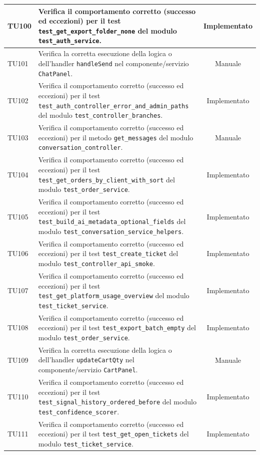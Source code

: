 \documentclass[a4paper,11pt,oneside]{scrartcl}
\begin{document}
\begin{longtable}{|p{1.9cm}|p{11.6cm}|c|}
    TU100 & Verifica il comportamento corretto (successo ed eccezioni) per il test \texttt{test\_get\_export\_folder\_none} del modulo \texttt{test\_auth\_service}. & Implementato \\ \hline
    TU101 & Verifica la corretta esecuzione della logica o dell'handler \texttt{handleSend} nel componente/servizio \texttt{ChatPanel}. & Manuale \\ \hline
    TU102 & Verifica il comportamento corretto (successo ed eccezioni) per il test \texttt{test\_auth\_controller\_error\_and\_admin\_paths} del modulo \texttt{test\_controller\_branches}. & Implementato \\ \hline
    TU103 & Verifica il comportamento corretto (successo ed eccezioni) per il metodo \texttt{get\_messages} del modulo \texttt{conversation\_controller}. & Manuale \\ \hline
    TU104 & Verifica il comportamento corretto (successo ed eccezioni) per il test \texttt{test\_get\_orders\_by\_client\_with\_sort} del modulo \texttt{test\_order\_service}. & Implementato \\ \hline
    TU105 & Verifica il comportamento corretto (successo ed eccezioni) per il test \texttt{test\_build\_ai\_metadata\_optional\_fields} del modulo \texttt{test\_conversation\_service\_helpers}. & Implementato \\ \hline
    TU106 & Verifica il comportamento corretto (successo ed eccezioni) per il test \texttt{test\_create\_ticket} del modulo \texttt{test\_controller\_api\_smoke}. & Implementato \\ \hline
    TU107 & Verifica il comportamento corretto (successo ed eccezioni) per il test \texttt{test\_get\_platform\_usage\_overview} del modulo \texttt{test\_ticket\_service}. & Implementato \\ \hline
    TU108 & Verifica il comportamento corretto (successo ed eccezioni) per il test \texttt{test\_export\_batch\_empty} del modulo \texttt{test\_order\_service}. & Implementato \\ \hline
    TU109 & Verifica la corretta esecuzione della logica o dell'handler \texttt{updateCartQty} nel componente/servizio \texttt{CartPanel}. & Manuale \\ \hline
    TU110 & Verifica il comportamento corretto (successo ed eccezioni) per il test \texttt{test\_signal\_history\_ordered\_before} del modulo \texttt{test\_confidence\_scorer}. & Implementato \\ \hline
    TU111 & Verifica il comportamento corretto (successo ed eccezioni) per il test \texttt{test\_get\_open\_tickets} del modulo \texttt{test\_ticket\_service}. & Implementato \\ \hline

\end{longtable}
\end{document}
